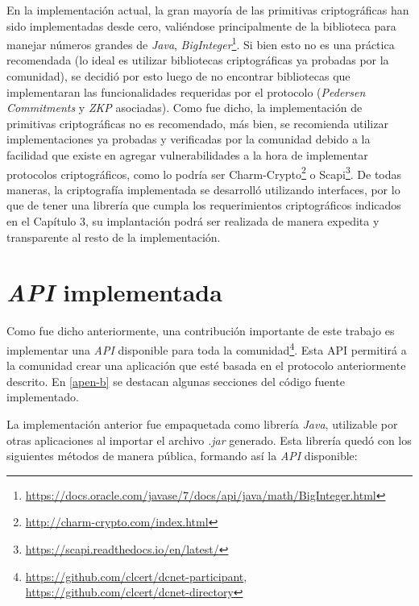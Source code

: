 En la implementación actual, la gran mayoría de las primitivas criptográficas 
han sido implementadas desde cero, valiéndose principalmente de la biblioteca 
para manejar números grandes de \emph{Java}, \emph{BigInteger}\footnote{\url{
https://docs.oracle.com/javase/7/docs/api/java/math/BigInteger.html}}. Si bien 
esto no es una práctica recomendada (lo ideal es utilizar bibliotecas 
criptográficas ya probadas por la comunidad), se decidió por esto luego de no 
encontrar bibliotecas que implementaran las funcionalidades requeridas por el 
protocolo (\emph{Pedersen Commitments} y \emph{ZKP} asociadas). Como fue 
dicho, la implementación de primitivas criptográficas no es recomendado, más 
bien, se recomienda utilizar implementaciones ya probadas y verificadas por la 
comunidad debido a la facilidad que existe en agregar vulnerabilidades 
a la hora de implementar protocolos criptográficos, como lo podría ser 
Charm-Crypto\footnote{\url{http://charm-crypto.com/index.html}} o 
Scapi\footnote{\url{https://scapi.readthedocs.io/en/latest/}}. De todas 
maneras, la criptografía implementada se desarrolló utilizando interfaces, por 
lo que de tener una librería que cumpla los requerimientos criptográficos 
indicados en el Capítulo 3, su implantación podrá ser realizada de manera 
expedita y transparente al resto de la implementación.

\section{\emph{API} implementada}

Como fue dicho anteriormente, una contribución importante de este trabajo 
es implementar una \emph{API} disponible para toda la 
comunidad\footnote{\url{https://github.com/clcert/dcnet-participant}, 
\url{https://github.com/clcert/dcnet-directory}}. Esta API 
permitirá a la comunidad crear una aplicación que esté basada en el protocolo 
anteriormente descrito. En \ref{apen-b} se destacan algunas secciones del 
código fuente implementado.

La implementación anterior fue empaquetada como librería \emph{Java}, 
utilizable por otras aplicaciones al importar el archivo \emph{.jar} generado. 
Esta librería quedó con los siguientes métodos de manera pública, formando así 
la \emph{API} disponible:


